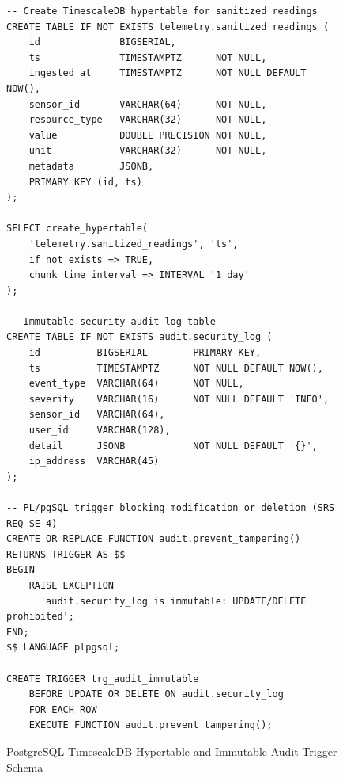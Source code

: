 \documentclass[a4paper]{article}
\begin{document}
\begin{figure}[H]
\centering
\begin{minipage}{0.95\linewidth}
\begin{Verbatim}[fontsize=\scriptsize,breaklines=true]
-- Create TimescaleDB hypertable for sanitized readings
CREATE TABLE IF NOT EXISTS telemetry.sanitized_readings (
    id              BIGSERIAL,
    ts              TIMESTAMPTZ      NOT NULL,
    ingested_at     TIMESTAMPTZ      NOT NULL DEFAULT NOW(),
    sensor_id       VARCHAR(64)      NOT NULL,
    resource_type   VARCHAR(32)      NOT NULL,
    value           DOUBLE PRECISION NOT NULL,
    unit            VARCHAR(32)      NOT NULL,
    metadata        JSONB,
    PRIMARY KEY (id, ts)
);

SELECT create_hypertable(
    'telemetry.sanitized_readings', 'ts',
    if_not_exists => TRUE,
    chunk_time_interval => INTERVAL '1 day'
);

-- Immutable security audit log table
CREATE TABLE IF NOT EXISTS audit.security_log (
    id          BIGSERIAL        PRIMARY KEY,
    ts          TIMESTAMPTZ      NOT NULL DEFAULT NOW(),
    event_type  VARCHAR(64)      NOT NULL,
    severity    VARCHAR(16)      NOT NULL DEFAULT 'INFO',
    sensor_id   VARCHAR(64),
    user_id     VARCHAR(128),
    detail      JSONB            NOT NULL DEFAULT '{}',
    ip_address  VARCHAR(45)
);

-- PL/pgSQL trigger blocking modification or deletion (SRS REQ-SE-4)
CREATE OR REPLACE FUNCTION audit.prevent_tampering()
RETURNS TRIGGER AS $$
BEGIN
    RAISE EXCEPTION
      'audit.security_log is immutable: UPDATE/DELETE prohibited';
END;
$$ LANGUAGE plpgsql;

CREATE TRIGGER trg_audit_immutable
    BEFORE UPDATE OR DELETE ON audit.security_log
    FOR EACH ROW
    EXECUTE FUNCTION audit.prevent_tampering();
\end{Verbatim}
\end{minipage}
\caption{PostgreSQL TimescaleDB Hypertable and Immutable Audit Trigger Schema}
\label{lst:database_schema_sql}
\end{figure}
\end{document}
